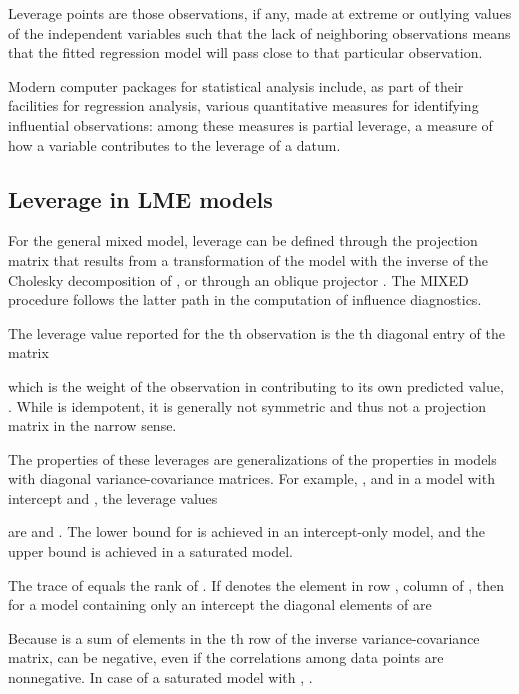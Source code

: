 \documentclass[12pt, a4paper]{article}
\begin{document}
Leverage points are those observations, if any, made at extreme or outlying values of the independent variables such that the lack of neighboring observations means that the fitted regression model will pass close to that particular observation.

Modern computer packages for statistical analysis include, as part of their facilities for regression analysis, various quantitative measures for identifying influential observations: among these measures is partial leverage, a measure of how a variable contributes to the leverage of a datum.




\subsection{Leverage in LME models}

For the general mixed model, leverage can be defined through the projection matrix that results from a transformation of the model with the inverse of the Cholesky decomposition of , or through an oblique projector \citep{schabenberger}. The MIXED procedure follows the latter path in the computation of influence diagnostics. 


The leverage value reported for the th observation is the th diagonal entry of the matrix

which is the weight of the observation in contributing to its own predicted value, .
While  is idempotent, it is generally not symmetric and thus not a projection matrix in the narrow sense.

The properties of these leverages are generalizations of the properties in models with diagonal variance-covariance matrices. For example, , and in a model with intercept and , the leverage values

are  and . The lower bound for  is achieved in an intercept-only model, and the upper bound is achieved in a saturated model. 

The trace of  equals the rank of .
If  denotes the element in row , column  of , then for a model containing only an intercept the diagonal elements of  are

Because  is a sum of elements in the th row of the inverse variance-covariance matrix,  can be negative, even if the correlations among data points are nonnegative. In case of a saturated model with , .			
			
\end{document}

